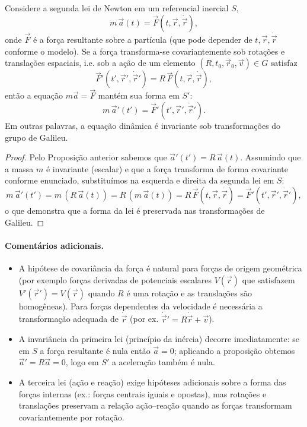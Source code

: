\documentclass[../main]{subfiles}
\begin{document}
\begin{prop}[Invariância das leis de Newton (forma \(m\vec a=\vec F\)) sob o grupo de Galileu]
  Considere a segunda lei de Newton em um referencial inercial \(S\),
  \[
    m\,\vec a(t) = \vec F(t,\vec r,\dot{\vec r}),
  \]
  onde \(\vec F\) é a força resultante sobre a partícula (que pode depender de \(t,\vec r,\dot{\vec r}\) conforme o modelo). Se a força transforma-se covariantemente sob rotações e translações espaciais, i.e. sob a ação de um elemento \((R,t_0,\vec r_0,\vec v)\in G\) satisfaz
  \[
    \vec F'(t',\vec r',\dot{\vec r}') = R\,\vec F(t,\vec r,\dot{\vec r}),
  \]
  então a equação \(m\vec a=\vec F\) mantém sua forma em \(S'\):
  \[
    m\,\vec a'(t') = \vec F'(t',\vec r',\dot{\vec r}').
  \]
  Em outras palavras, a equação dinâmica é invariante sob transformações do grupo de Galileu.
\end{prop}

\begin{proof}
  Pelo Proposição anterior sabemos que \(\vec a'(t')=R\,\vec a(t)\). Assumindo que a massa \(m\) é invariante (escalar) e que a força transforma de forma covariante conforme enunciado, substituímos na esquerda e direita da segunda lei em \(S\):
  \[
    m\,\vec a'(t') = m\,(R\,\vec a(t)) = R\,(m\,\vec a(t)) = R\,\vec F(t,\vec r,\dot{\vec r}) = \vec F'(t',\vec r',\dot{\vec r}'),
  \]
  o que demonstra que a forma da lei é preservada nas transformações de Galileu.
\end{proof}

\paragraph{Comentários adicionais.}
\begin{itemize}
  \item A hipótese de covariância da força é natural para forças de origem geométrica (por exemplo forças derivadas de potenciais escalares \(V(\vec r)\) que satisfazem \(V'( \vec r') = V(\vec r)\) quando \(R\) é uma rotação e as translações são homogêneas). Para forças dependentes da velocidade é necessária a transformação adequada de \(\dot{\vec r}\) (por ex. \(\dot{\vec r}'=R\dot{\vec r}+\vec v\)).
  \item A invariância da primeira lei (princípio da inércia) decorre imediatamente: se em \(S\) a força resultante é nula então \( \vec a=0\); aplicando a proposição obtemos \(\vec a'=R\vec a=0\), logo em \(S'\) a aceleração também é nula.
  \item A terceira lei (ação e reação) exige hipóteses adicionais sobre a forma das forças internas (ex.: forças centrais iguais e opostas), mas rotações e translações preservam a relação ação–reação quando as forças transformam covariantemente por rotação.
\end{itemize}
\end{document}

